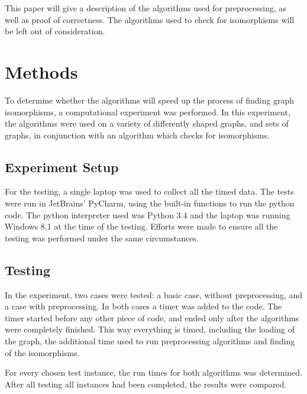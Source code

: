 \documentclass[twoside]{article}
\theoremstyle{definition}
\theoremstyle{plain}
\begin{document}
\begin{multicols}{2}
This paper will give a description of the algorithms used for preprocessing, as well as proof of correctness. The algorithms used to check for isomorphisms will be left out of consideration.

\section{Methods}
To determine whether the algorithms will speed up the process of finding graph isomorphisms, a computational experiment was performed. In this experiment, the algorithms were used on a variety of differently shaped graphs, and sets of graphs, in conjunction with an algorithm which checks for isomorphisms.

\subsection{Experiment Setup}
For the testing, a single laptop was used to collect all the timed data. The tests were run in JetBrains' PyCharm, using the built-in functions to run the python code. The python interpreter used was Python 3.4 and the laptop was running Windows 8.1 at the time of the testing. Efforts were made to ensure all the testing was performed under the same circumstances.

\subsection{Testing}
In the experiment, two cases were tested: a basic case, without preprocessing, and a case with preprocessing. In both cases a timer was added to the code. The timer started before any other piece of code, and ended only after the algorithms were completely finished. This way everything is timed, including the loading of the graph, the additional time used to run preprocessing algorithms and finding of the isomorphisms.

For every chosen test instance, the run times for both algorithms was determined. After all testing all instances had been completed, the results were compared.


\end{multicols}
\end{document}
